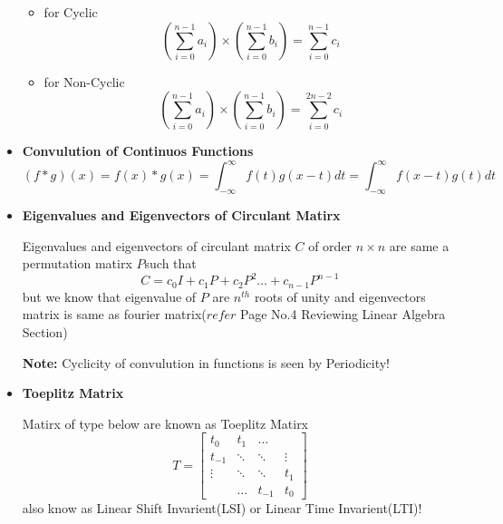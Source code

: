 \documentclass[a4paper]{article}
\numberwithin{equation}{section}
\begin{document}
\begin{itemize}
    \begin{itemize}
    \item for Cyclic
\[\left(\sum_{i=0}^{n-1}a_i\right) \times \left(\sum_{i=0}^{n-1}b_i\right)=\sum_{i=0}^{n-1}c_i\]
    \item for Non-Cyclic
\[\left(\sum_{i=0}^{n-1}a_i\right) \times \left(\sum_{i=0}^{n-1}b_i\right)=\sum_{i=0}^{2n-2}c_i\]
    \end{itemize}

\item \textbf{Convulution of Continuos Functions}
\[\boxed{(f\ast g)(x)=f(x)\ast g(x)=\int_{-\infty}^{\infty}f(t)g(x-t)dt=\int_{-\infty}^{\infty}f(x-t)g(t)dt}\]

\item \textbf{Eigenvalues and Eigenvectors of Circulant Matirx}

Eigenvalues and eigenvectors of circulant matrix $C$ of order $n\times n$ are same a permutation matirx $P$such that
\[C=c_0I+c_1P+c_2P^2\dots+c_{n-1}P^{n-1}\]
but we know that eigenvalue of $P$ are $n^{th}$ roots of unity and eigenvectors matrix is same as fourier matrix($refer$ Page No.4 Reviewing Linear Algebra Section)

\textbf{Note:} Cyclicity of convulution in functions is seen by Periodicity!

\item \textbf{Toeplitz Matrix}

Matirx of type below are known as Toeplitz Matirx
\[T=\begin{bmatrix}
    t_0&t_1&\dots&\\
    t_{-1}&\ddots&\ddots&\vdots\\
    \vdots&\ddots&\ddots&t_1\\
    &\dots&t_{-1}&t_0
\end{bmatrix}\]
also know as Linear Shift Invarient(LSI) or Linear Time Invarient(LTI)!


\end{itemize}
\end{document}
